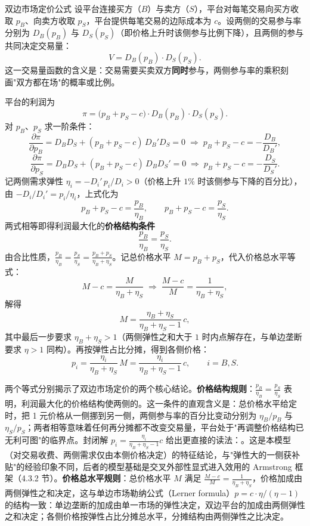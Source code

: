 \begin{derivation}{双边市场定价公式}{}
设平台连接买方（$B$）与卖方（$S$），平台对每笔交易向买方收取 $p_B$、向卖方收取 $p_S$，平台提供每笔交易的边际成本为 $c$。设两侧的交易参与率分别为 $D_B(p_B)$ 与 $D_S(p_S)$（即价格上升时该侧参与比例下降），且两侧的参与共同决定交易量：
\[
V = D_B(p_B) \cdot D_S(p_S).
\]
这一交易量函数的含义是：交易需要买卖双方\textbf{同时}参与，两侧参与率的乘积刻画"双方都在场"的概率或比例。

平台的利润为
\[
\pi = \bigl(p_B + p_S - c\bigr) \cdot D_B(p_B) \cdot D_S(p_S).
\]
对 $p_B$、$p_S$ 求一阶条件：
\[
\frac{\partial \pi}{\partial p_B} = D_BD_S + (p_B+p_S-c)\,D_B'D_S = 0
\;\Longrightarrow\; p_B+p_S-c = -\frac{D_B}{D_B'},
\]
\[
\frac{\partial \pi}{\partial p_S} = D_BD_S + (p_B+p_S-c)\,D_BD_S' = 0
\;\Longrightarrow\; p_B+p_S-c = -\frac{D_S}{D_S'}.
\]
记两侧需求弹性 $\eta_i = -D_i'\,p_i/D_i > 0$（价格上升 $1\%$ 时该侧参与下降的百分比），由 $-D_i/D_i' = p_i/\eta_i$，上式化为
\[
p_B+p_S-c = \frac{p_B}{\eta_B}, \qquad p_B+p_S-c = \frac{p_S}{\eta_S}.
\]
两式相等即得利润最大化的\textbf{价格结构条件}
\[
\frac{p_B}{\eta_B} = \frac{p_S}{\eta_S}.
\]
由合比性质，$\frac{p_B}{\eta_B} = \frac{p_S}{\eta_S} = \frac{p_B+p_S}{\eta_B+\eta_S}$。记总价格水平 $M = p_B+p_S$，代入价格总水平等式：
\[
M - c = \frac{M}{\eta_B+\eta_S}
\;\Longrightarrow\; \frac{M-c}{M} = \frac{1}{\eta_B+\eta_S},
\]
解得
\[
M = \frac{\eta_B+\eta_S}{\eta_B+\eta_S-1}\,c,
\]
其中最后一步要求 $\eta_B+\eta_S>1$（两侧弹性之和大于 $1$ 时内点解存在，与单边垄断要求 $\eta>1$ 同构）。再按弹性占比分摊，得到各侧价格：
\[
p_i = \frac{\eta_i}{\eta_B+\eta_S}\,M = \frac{\eta_i}{\eta_B+\eta_S-1}\,c, \qquad i = B,S.
\]
\end{derivation}

两个等式分别揭示了双边市场定价的两个核心结论。\textbf{价格结构规则}：$\frac{p_B}{\eta_B} = \frac{p_S}{\eta_S}$ 表明，利润最大化的价格结构使两侧的。这一条件的直观含义是：总价格水平给定时，把 1 元价格从一侧挪到另一侧，两侧参与率的百分比变动分别为 $\eta_B/p_B$ 与 $\eta_S/p_S$；两者相等意味着任何再分摊都不改变交易量，平台处于"再调整价格结构已无利可图"的临界点。封闭解 $p_i = \frac{\eta_i}{\eta_B+\eta_S-1}c$ 给出更直接的读法：。这是本模型（对交易收费、两侧需求仅由本侧价格决定）的特征结论，与"弹性大的一侧获补贴"的经验印象不同，后者的模型基础是交叉外部性显式进入效用的 Armstrong 框架（4.3.2 节）。\textbf{价格总水平规则}：总价格水平 $M$ 满足 $\frac{M-c}{M} = \frac{1}{\eta_B+\eta_S}$，价格加成由两侧弹性之和决定，这与单边市场勒纳公式（Lerner formula）$p = c \cdot \eta/(\eta-1)$ 的结构一致：单边垄断的加成由单一市场的弹性决定，双边平台的加成由两侧弹性之和决定；各侧价格按弹性占比分摊总水平，分摊结构由两侧弹性之比决定。

